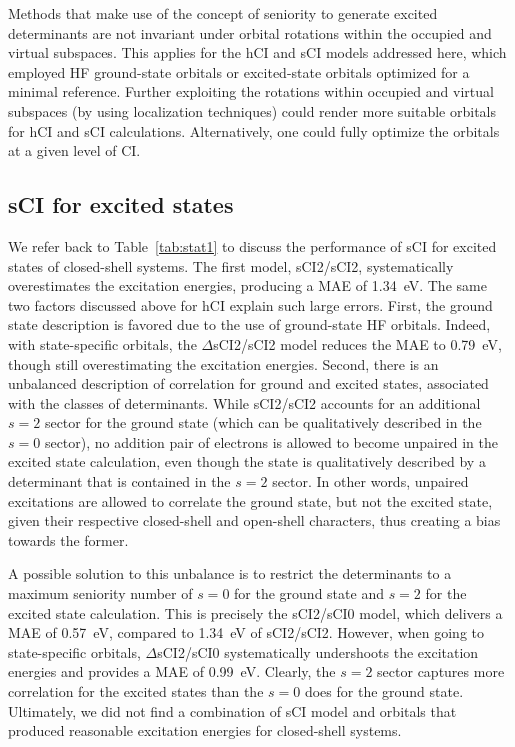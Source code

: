 \documentclass[aip,jcp,reprint,noshowkeys,superscriptaddress]{revtex4-1}
\begin{document}
Methods that make use of the concept of seniority to generate excited determinants
are not invariant under orbital rotations within the occupied and virtual subspaces. \cite{Bytautas_2011,Limacher_2014,Stein_2014}
This applies for the hCI and sCI models addressed here,
which employed HF ground-state orbitals or excited-state orbitals optimized for a minimal reference.
Further exploiting the rotations within occupied and virtual subspaces (by using localization techniques) could render more suitable orbitals for hCI and sCI calculations.
Alternatively, one could fully optimize the orbitals at a given level of CI. \cite{Kossoski_2022}


\subsection{sCI for excited states}
\label{sec:res_D}

We refer back to Table~\ref{tab:stat1} to discuss the performance of sCI for excited states of closed-shell systems.
The first model, sCI2/sCI2, systematically overestimates the excitation energies, producing a MAE of \SI{1.34}{\eV}.
The same two factors discussed above for hCI explain such large errors.
First, the ground state description is favored due to the use of ground-state HF orbitals.
Indeed, with state-specific orbitals, the $\Delta$sCI2/sCI2 model reduces the MAE to \SI{0.79}{\eV}, though still overestimating the excitation energies.
Second, there is an unbalanced description of correlation for ground and excited states, associated with the classes of determinants.
While sCI2/sCI2 accounts for an additional $s=2$ sector for the ground state (which can be qualitatively described in the $s=0$ sector),
no addition pair of electrons is allowed to become unpaired in the excited state calculation, even though the state is qualitatively described by a determinant that is contained in the $s=2$ sector.
In other words, unpaired excitations are allowed to correlate the ground state, but not the excited state, given their respective closed-shell and open-shell characters,
thus creating a bias towards the former.

A possible solution to this unbalance is to restrict the determinants to a maximum seniority number of $s=0$ for the ground state and $s=2$ for the excited state calculation.
This is precisely the sCI2/sCI0 model, which delivers a MAE of \SI{0.57}{\eV}, compared to \SI{1.34}{\eV} of sCI2/sCI2.
However, when going to state-specific orbitals, $\Delta$sCI2/sCI0 systematically undershoots the excitation energies and provides a MAE of \SI{0.99}{\eV}.
Clearly, the $s=2$ sector captures more correlation for the excited states than the $s=0$ does for the ground state.
Ultimately, we did not find a combination of sCI model and orbitals that produced reasonable excitation energies for closed-shell systems.
\end{document}
